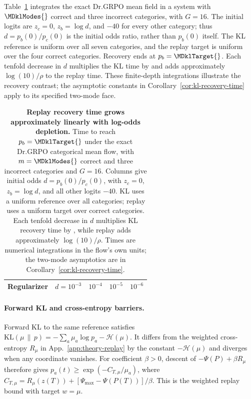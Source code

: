 \documentclass{article}
\newcommand{\1}{\mathbf 1}
\theoremstyle{remark}
\theoremstyle{definition}
\theoremstyle{plain}
\begin{document}
Table~\ref{tab:kl-recovery} integrates the exact Dr.GRPO mean field in a
system with $\MDklModes{}$ correct and three incorrect categories, with
$G=16$. The initial logits are $z_c=0$, $z_b=\log d$, and $-40$ for every
other category; thus $d=p_b(0)/p_c(0)$ is the initial odds ratio, rather than
$p_b(0)$ itself. The KL reference is uniform over all seven categories, and
the replay target is uniform over the four correct categories. Recovery ends
at $p_b=\MDklTarget{}$. Each tenfold decrease in $d$ multiplies the KL time
by \MDklDecadeKL{} and adds approximately $\log(10)/\rho$ to the replay
time. These finite-depth integrations illustrate the recovery contrast;
the asymptotic constants in Corollary~\ref{cor:kl-recovery-time} apply to
its specified two-mode face.

\begin{table}[t]
  \centering
  \caption{\textbf{Replay recovery time grows approximately linearly with
  log-odds depletion.} Time to reach $p_b=\MDklTarget{}$ under the exact
  Dr.GRPO categorical mean flow, with $m=\MDklModes{}$ correct and three
  incorrect categories and $G=16$. Columns give initial odds
  $d=p_b(0)/p_c(0)$, with $z_c=0$, $z_b=\log d$, and all other logits $-40$.
  KL uses a uniform reference over all categories; replay uses a uniform
  target over correct categories. Each tenfold decrease in $d$ multiplies
  KL recovery time by \MDklDecadeKL{}, while replay adds approximately
  $\log(10)/\rho$. Times are numerical integrations in the flow's own units;
  the two-mode asymptotics are in Corollary~\ref{cor:kl-recovery-time}.}
  \label{tab:kl-recovery}
  \small
  \setlength{\tabcolsep}{6pt}
  \begin{tabular}{@{}lrrrr@{}}
    \toprule
    \textbf{Regularizer} & $d=10^{-3}$ & $10^{-4}$ & $10^{-5}$ & $10^{-6}$ \\
    \midrule
    
  \end{tabular}
\end{table}

\paragraph{Forward KL and cross-entropy barriers.}
Forward KL to the same reference satisfies
$\mathrm{KL}(\mu\,\|\,p)=-\sum_a\mu_a\log p_a-\mathcal H(\mu)$.
It differs from the weighted cross-entropy $R_\mu$ in
App.~\ref{app:theory-replay} by the constant $-\mathcal H(\mu)$ and diverges
when any coordinate vanishes. For coefficient $\beta>0$, descent of
$-\Psi(P)+\beta R_\mu$ therefore gives
$p_a(t)\ge\exp(-C_{T,\mu}/\mu_a)$, where
$C_{T,\mu}=R_\mu(z(T))+[\Psi_{\max}-\Psi(P(T))]/\beta$.
This is the weighted replay bound with target $w=\mu$.
\end{document}
